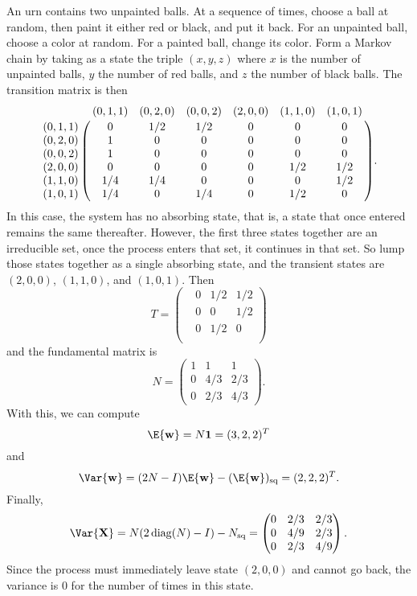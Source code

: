 \documentclass[12pt]{article}
\begin{document}
\begin{example}
    An urn contains two unpainted balls.  At a sequence of times, choose
    a ball at random, then paint it either red or black, and put it
    back.  For an unpainted ball, choose a color at random.  For a
    painted ball, change its color.  Form a Markov chain by taking as a
    state the triple \( (x,y,z) \) where \( x \) is the number of
    unpainted balls, \( y \) the number of red balls, and \( z \) the
    number of black balls.  The transition matrix is then
    \[
        \bordermatrix{ & (0,1,1) & (0,2,0) & (0,0,2) & (2,0,0) & (1,1,0)
        & (1,0,1) \cr
        (0,1,1) & 0 & 1/2 & 1/2 & 0 & 0 & 0 \cr
        (0,2,0) & 1 & 0 & 0 & 0 & 0 & 0 \cr
        (0,0,2) & 1 & 0 & 0 & 0 & 0 & 0 \cr
        (2,0,0) & 0 & 0 & 0 & 0 & 1/2 & 1/2 \cr
        (1,1,0) & 1/4 & 1/4 & 0 & 0 & 0 & 1/2 \cr
        (1,0,1) & 1/4 & 0 & 1/4 & 0 & 1/2 & 0 \cr
        }.
    \] In this case, the system has no absorbing state, that is, a state
    that once entered remains the same thereafter.  However, the first
    three states together are an irreducible set, once the process
    enters that set, it continues in that set.  So lump those states
    together as a single absorbing state, and the transient states are \(
    (2,0,0) \), \( (1,1,0) \), and \( (1,0,1) \).  Then
    \[
        T =
        \begin{pmatrix}
            & 0 & 1/2 & 1/2 \\
            & 0 & 0 & 1/2 \\
            & 0 & 1/2 & 0 \\
        \end{pmatrix}
    \] and the fundamental matrix is
    \[
        N =
        \begin{pmatrix}
            1 & 1 & 1\\
            0 & 4/3 & 2/3\\
            0 & 2/3 & 4/3
        \end{pmatrix}
        .
    \] With this, we can compute
    \[
        \E{\mathbf{w}} = N \mathbf{1} = (3, 2, 2)^T
    \] and
    \[
        \Var{\mathbf{w}} = (2N-I)\E{\mathbf{w}}-(\E{\mathbf{w}})_{\text{sq}}
        = (2,2,2)^T.
    \] Finally,
    \[
        \Var{\mathbf{X}} = N(2
        \operatorname{diag}
        (N) - I) - N_{\text{sq}} =
        \begin{pmatrix}
            0 & 2/3 & 2/3 \\
            0 & 4/9 & 2/3 \\
            0 & 2/3 & 4/9
        \end{pmatrix}
        .
    \] Since the process must immediately leave state \( (2,0,0) \) and
    cannot go back, the variance is \( 0 \) for the number of times in
    this state.
\end{example}
\end{document}
